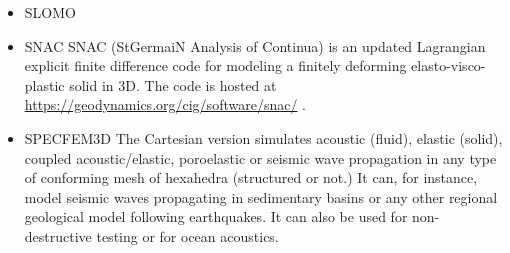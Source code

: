 \begin{itemize}
\begin{scriptsize}
\begin{itemize}
\item[\twothousandeight]     \textcite{poso08}
\item[\twothousandten]       \textcite{qusp10}
\item[\twothousandtwelve]    \textcite{brps12}
\item[\twothousandthirteen]  \textcite{brps13},  \textcite{brau13}
\item[\twothousandfourteen]  \textcite{brun14},  \textcite{hebr14},  \textcite{kobf14}
\item[\twothousandfifteen]   \textcite{clbq15}
\item[\twothousandseventeen] \textcite{brcr17},  \textcite{baso17} 
\item[\twothousandeighteen]  \textcite{basq18},  \textcite{osss18},  \textcite{osss18b}
\end{itemize}
\end{scriptsize}

\item {\codefont SLOMO} 

{\small
\noindent
\textcite{kaus05}
\textcite{kasb08}
}

\item {\codefont SNAC} 
SNAC (StGermaiN Analysis of Continua) is an updated Lagrangian explicit finite 
difference code for modeling a finitely deforming elasto-visco-plastic solid in 3D.
The code is hosted at \url{https://geodynamics.org/cig/software/snac/} .

\begin{scriptsize}
\textcite{chlg08}
\textcite{chgu08}
\textcite{qula10}
\textcite{chss11}
\end{scriptsize}


\item {\codefont SPECFEM3D} 
The Cartesian version simulates acoustic (fluid), elastic (solid), coupled acoustic/elastic, 
poroelastic or seismic wave propagation in any type of conforming mesh of hexahedra 
(structured or not.) It can, for instance, model seismic waves propagating in sedimentary 
basins or any other regional geological model following earthquakes. It can also be used 
for non-destructive testing or for ocean acoustics. 


\end{itemize}
